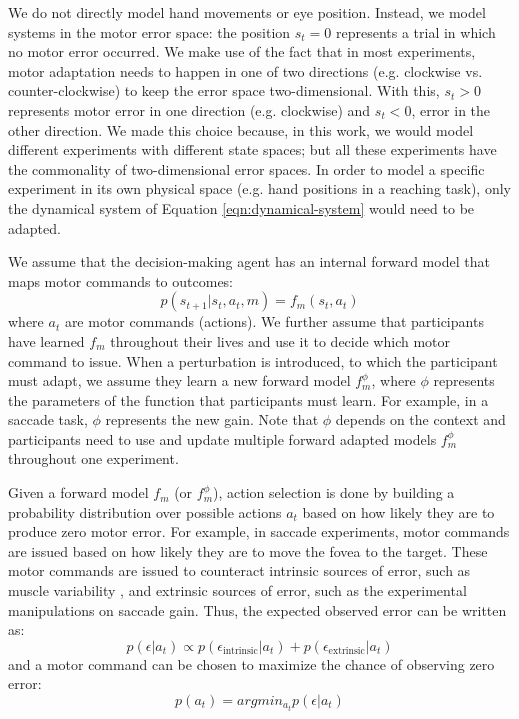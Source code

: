 \documentclass[a4paper,doc,floatsintext,natbib]{apa6}
\def \eref #1{Equation \ref{#1}}   %
\begin{document}
We do not directly model hand movements or eye position. Instead, we model
systems in the motor error space: the position $s_t = 0$ represents a trial in
which no motor error occurred. We make use of the fact that in most
experiments, motor adaptation needs to happen in one of two directions
(e.g. clockwise vs. counter-clockwise) to keep the error space
two-dimensional. With this, $s_t > 0$ represents motor error in one direction
(e.g. clockwise) and $s_t < 0$, error in the other direction. We made this
choice because, in this work, we would model different experiments with
different state spaces; but all these experiments have the commonality of
two-dimensional error spaces. In order to model a specific experiment in its
own physical space (e.g. hand positions in a reaching task), only the dynamical
system of \eref{eqn:dynamical-system} would need to be adapted.

We assume that the decision-making agent has an internal forward model that
maps motor commands to outcomes:
\begin{equation}
p(s_{t+1} | s_t, a_t, m) = f_m(s_t, a_t)
\end{equation}
where $a_t$ are motor commands (actions). We further assume that participants
have learned $f_m$ throughout their lives and use it to decide which motor
command to issue. When a perturbation is introduced, to which the participant
must adapt, we assume they learn a new forward model $f_m^{\phi}$, where $\phi$
represents the parameters of the function that participants must learn. For
example, in a saccade task, $\phi$ represents the new gain. Note that $\phi$
depends on the context and participants need to use and update multiple
forward adapted models $f_m^{\phi}$ throughout one experiment.

Given a forward model $f_m$ (or $f_m^\phi$), action selection is done by
building a probability distribution over possible actions $a_t$ based on how
likely they are to produce zero motor error. For example, in saccade
experiments, motor commands are issued based on how likely they are to move the
fovea to the target. These motor commands are issued to counteract intrinsic
sources of error, such as muscle variability , and extrinsic
sources of error, such as the experimental manipulations on saccade gain. Thus,
the expected observed error can be written as:
\begin{equation}
p(\epsilon | a_t) \propto p(\epsilon_{\text{intrinsic}} | a_t) + p(\epsilon_{\text{extrinsic}} | a_t)
\end{equation}
and a motor command can be chosen to maximize the chance of observing zero error:
\begin{equation}
p(a_t) = argmin_{a_t} p(\epsilon | a_t)
\end{equation}
\end{document}
